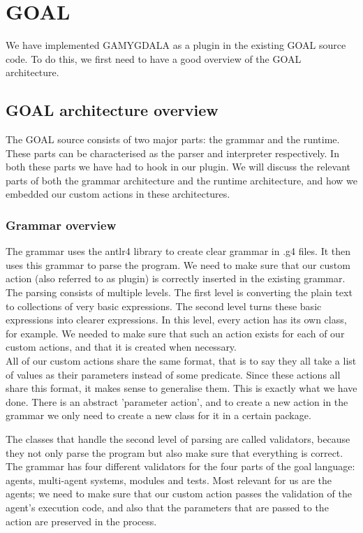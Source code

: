 \section{GOAL}
We have implemented GAMYGDALA as a plugin in the existing GOAL source code. To do this, we first need to have a good overview of the GOAL architecture.

\subsection{GOAL architecture overview}
The GOAL source consists of two major parts: the grammar and the runtime. These parts can be characterised as the parser and interpreter respectively. In both these parts we have had to hook in our plugin. We will discuss the relevant parts of both the grammar architecture and the runtime architecture, and how we embedded our custom actions in these architectures.

\subsubsection{Grammar overview} 
The grammar uses the antlr4 library to create clear grammar in .g4 files. It then uses this grammar to parse the program. We need to make sure that our custom action (also referred to as plugin) is correctly inserted in the existing grammar. \\ 

The parsing consists of multiple levels. The first level is converting the plain text to collections of very basic expressions. The second level turns these basic expressions into clearer expressions. In this level, every action has its own class, for example. We needed to make sure that such an action exists for each of our custom actions, and that it is created when necessary. \\

All of our custom actions share the same format, that is to say they all take a list of values as their parameters instead of some predicate. Since these actions all share this format, it makes sense to generalise them. This is exactly what we have done. There is an abstract 'parameter action', and to create a new action in the grammar we only need to create a new class for it in a certain package. 

The classes that handle the second level of parsing are called validators, because they not only parse the program but also make sure that everything is correct. The grammar has four different validators for the four parts of the goal language: agents, multi-agent systems, modules and tests. Most relevant for us are the agents; we need to make sure that our custom action passes the validation of the agent's execution code, and also that the parameters that are passed to the action are preserved in the process. \\ 


